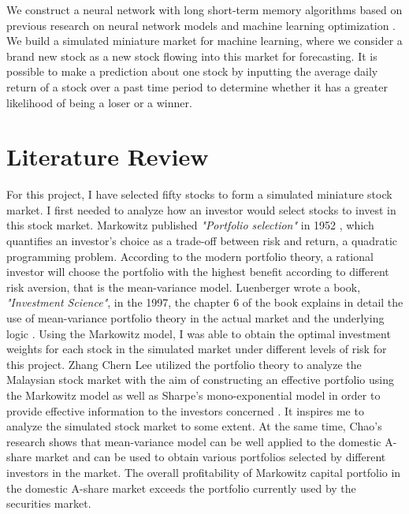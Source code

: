 \documentclass[default,iicol]{sn-jnl}%
\begin{document}
We construct a neural network with long short-term memory algorithms based on previous research on neural network models and machine learning optimization \cite{2005A,2010Rectified,2014Adam,1997Long}. We build a simulated miniature market for machine learning, where we consider a brand new stock as a new stock flowing into this market for forecasting. It is possible to make a prediction about one stock by inputting the average daily return \cite{1988Game} of a stock over a past time period to determine whether it has a greater likelihood of being a loser or a winner.

\section{Literature Review}\label{sec2}

\hspace{1.5em}For this project, I have selected fifty stocks to form a simulated miniature stock market. I first needed to analyze how an investor would select stocks to invest in this stock market. Markowitz published \textit{"Portfolio selection"} in 1952 \cite{1952Portfolio}, which quantifies an investor's choice as a trade-off between risk and return, a quadratic programming problem. According to the modern portfolio theory, a rational investor will choose the portfolio with the highest benefit according to different risk aversion, that is the mean-variance model. Luenberger wrote a book, \textit{"Investment Science"}, in the 1997, the chapter 6 of the book explains in detail the use of mean-variance portfolio theory in the actual market and the underlying logic \cite{2009Investment}. Using the Markowitz model, I was able to obtain the optimal investment weights for each stock in the simulated market under different levels of risk for this project. Zhang Chern Lee utilized the portfolio theory to analyze the Malaysian stock market with the aim of constructing an effective portfolio using the Markowitz model as well as Sharpe's mono-exponential model in order to provide effective information to the investors concerned \cite{lee2024comparison}. It inspires me to analyze the simulated stock market to some extent. At the same time, Chao’s research \cite{2019Application} shows that mean-variance model can be well applied to the domestic A-share market and can be used to obtain various portfolios selected by different investors in the market. The overall profitability of Markowitz capital portfolio in the domestic A-share market exceeds the portfolio currently used by the securities market.
\end{document}
